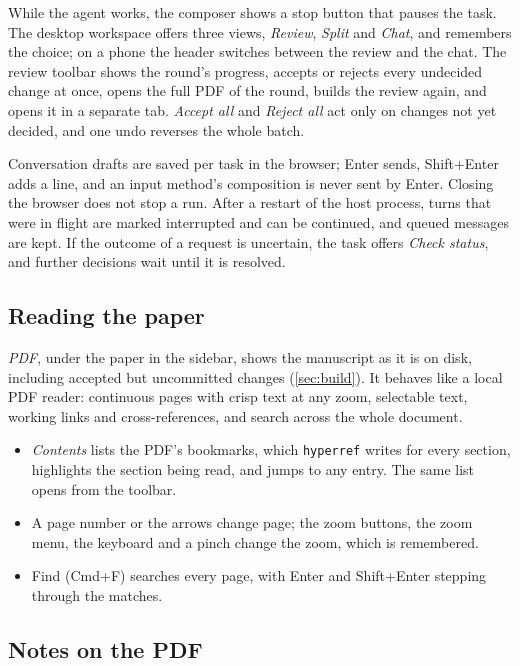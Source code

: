 While the agent works, the composer shows a stop button that pauses the task.
The desktop workspace offers three views, \emph{Review}, \emph{Split} and
\emph{Chat}, and remembers the choice; on a phone the header switches between
the review and the chat. The review toolbar shows the round's progress, accepts
or rejects every undecided change at once, opens the full PDF of the round,
builds the review again, and opens it in a separate tab. \emph{Accept all} and
\emph{Reject all} act only on changes not yet decided, and one undo reverses the
whole batch.

Conversation drafts are saved per task in the browser; Enter sends, Shift+Enter
adds a line, and an input method's composition is never sent by Enter. Closing
the browser does not stop a run. After a restart of the host process, turns that
were in flight are marked interrupted and can be continued, and queued messages
are kept. If the outcome of a request is uncertain, the task offers
\emph{Check status}, and further decisions wait until it is resolved.

\subsection{Reading the paper}

\emph{PDF}, under the paper in the sidebar, shows the manuscript as it is on
disk, including accepted but uncommitted changes (\cref{sec:build}). It behaves
like a local PDF reader: continuous pages with crisp text at any zoom,
selectable text, working links and cross-references, and search across the
whole document.
\begin{itemize}
  \item \emph{Contents} lists the PDF's bookmarks, which \texttt{hyperref}
    writes for every section, highlights the section being read, and jumps to
    any entry. The same list opens from the toolbar.
  \item A page number or the arrows change page; the zoom buttons, the zoom
    menu, the keyboard and a pinch change the zoom, which is remembered.
  \item Find (Cmd+F) searches every page, with Enter and Shift+Enter stepping
    through the matches.
\end{itemize}

\subsection{Notes on the PDF}

